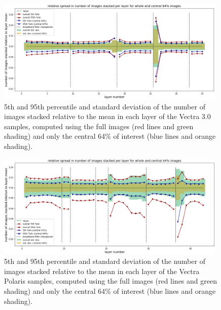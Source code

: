 \documentclass[letterpaper,11pt]{article}
\begin{document}
\begin{figure}[!ht]
\centering
\includegraphics[width=0.98\textwidth]{images/measuring_flatfield_corrections/mask_stack_variation_reduction_vectra}
\caption{\footnotesize 5th and 95th percentile and standard deviation of the number of images stacked relative to the mean in each layer of the Vectra 3.0 samples, computed using the full images (red lines and green shading) and only the central 64\% of interest (blue lines and orange shading).}
\label{fig:removing_image_edges_effect_on_mask_stacks_vectra}
\end{figure} 

\begin{figure}[!ht]
\centering
\includegraphics[width=0.98\textwidth]{images/measuring_flatfield_corrections/mask_stack_variation_reduction_polaris}
\caption{\footnotesize 5th and 95th percentile and standard deviation of the number of images stacked relative to the mean in each layer of the Vectra Polaris samples, computed using the full images (red lines and green shading) and only the central 64\% of interest (blue lines and orange shading).}
\label{fig:removing_image_edges_effect_on_mask_stacks_polaris}
\end{figure} 
\end{document}

